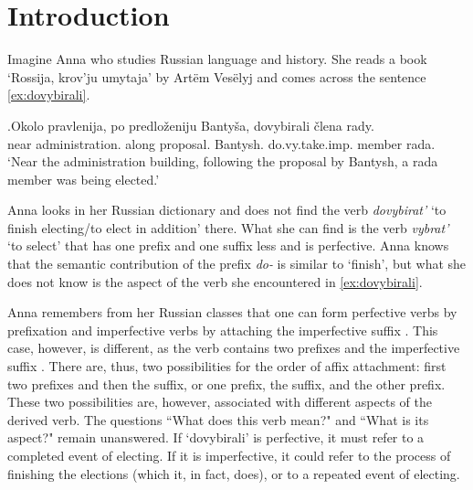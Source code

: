 
\chapter{Introduction} %
\label{Chapter1}
Imagine Anna who studies Russian language and history. She reads a book `Rossija, krov'ju umytaja' by Art\"{e}m Ves\"{e}lyj  and comes across the sentence \ref{ex:dovybirali}.

\exg.\label{ex:dovybirali}Okolo pravlenija, po predlo\v{z}eniju Banty\v{s}a, dovybirali \v{c}lena rady.\\
near administration. along proposal. Bantysh. do.vy.take.imp. member rada.\\
\vspace{0.3em}
`Near the administration building, following the proposal by Bantysh, a rada member was being elected.'

Anna looks in her Russian dictionary and does not find the verb \textit{dovybirat'} `to finish electing/to elect in addition' there.  What she can find is the verb \textit{vybrat'} `to select'  that has one prefix and one suffix less and is perfective. Anna knows that the semantic contribution of the prefix \textit{do-}   is similar to `finish', but what she does not know is the aspect of the verb she encountered in \ref{ex:dovybirali}. 

Anna remembers from her Russian classes that one can form perfective verbs  by prefixation  and imperfective verbs  by attaching the imperfective suffix  . This case, however, is different, as the verb contains two prefixes and the imperfective suffix  . There are, thus, two possibilities for the order of affix attachment: first two prefixes and then the suffix, or one prefix, the suffix, and the other prefix. These two possibilities are, however, associated with different aspects of the derived verb. The questions ``What does this verb mean?" and ``What is its aspect?" remain unanswered. If `dovybirali' is perfective, it must refer to a completed event of electing. If it is imperfective, it could refer to the process of finishing the elections (which it, in fact, does), or to a repeated event of electing. 

